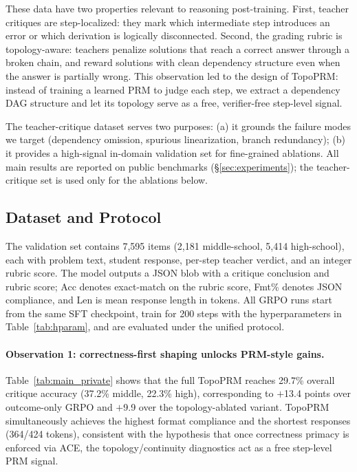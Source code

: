 These data have two properties relevant to reasoning post-training.
First, teacher critiques are step-localized: they mark which intermediate step introduces an error or which derivation is logically disconnected.
Second, the grading rubric is topology-aware: teachers penalize solutions that reach a correct answer through a broken chain, and reward solutions with clean dependency structure even when the answer is partially wrong.
This observation led to the design of TopoPRM: instead of training a learned PRM to judge each step, we extract a dependency DAG structure and let its topology serve as a free, verifier-free step-level signal.

The teacher-critique dataset serves two purposes: (a) it grounds the failure modes we target (dependency omission, spurious linearization, branch redundancy); (b) it provides a high-signal in-domain validation set for fine-grained ablations.
All main results are reported on public benchmarks (\S\ref{sec:experiments}); the teacher-critique set is used only for the ablations below.

\subsection{Dataset and Protocol}
The validation set contains 7,595 items (2,181 middle-school, 5,414 high-school), each with problem text, student response, per-step teacher verdict, and an integer rubric score.
The model outputs a JSON blob with a critique conclusion and rubric score; Acc denotes exact-match on the rubric score, Fmt\% denotes JSON compliance, and Len is mean response length in tokens.
All GRPO runs start from the same SFT checkpoint, train for 200 steps with the hyperparameters in Table~\ref{tab:hparam}, and are evaluated under the unified protocol.



\paragraph{Observation 1: correctness-first shaping unlocks PRM-style gains.}
Table~\ref{tab:main_private} shows that the full TopoPRM reaches 29.7\% overall critique accuracy (37.2\% middle, 22.3\% high), corresponding to $+$13.4 points over outcome-only GRPO and $+$9.9 over the topology-ablated variant.
TopoPRM simultaneously achieves the highest format compliance and the shortest responses (364/424 tokens), consistent with the hypothesis that once correctness primacy is enforced via ACE, the topology/continuity diagnostics act as a free step-level PRM signal.

